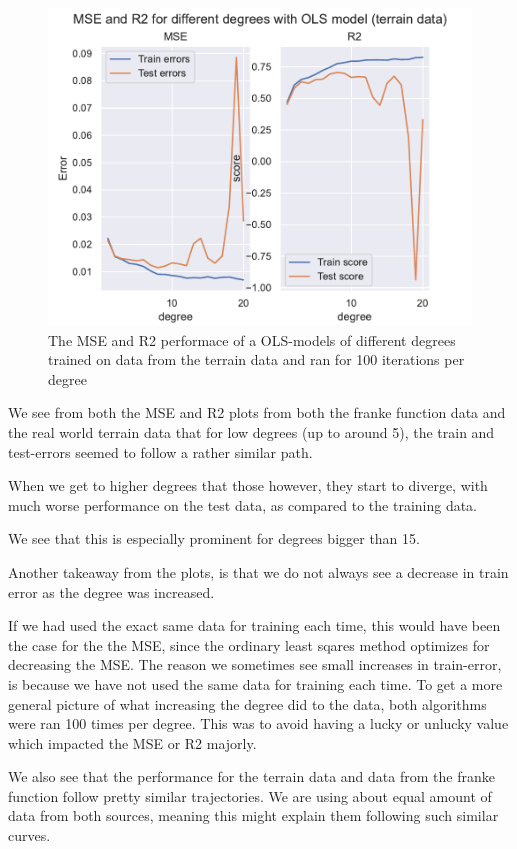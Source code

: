 \documentclass[12pt]{article}
\begin{document}
\begin{figure}[H]
    \centering
    \includegraphics[width=0.8\columnwidth]{../src/output/ols_mse_r2_terrain_data.pdf}
    \caption{The MSE and R2 performace of a OLS-models of different degrees trained on data from the terrain data and ran for 100 iterations per degree}
    \label{fig:ols_mse_r2_terrain}
\end{figure}

We see from both the MSE and R2 plots from both the franke function data and the real world terrain data that for low degrees (up to around 5), the train and test-errors seemed to follow a rather similar path.

When we get to higher degrees that those however, they start to diverge, with much worse performance on the test data, as compared to the training data.

We see that this is especially prominent for degrees bigger than 15.

Another takeaway from the plots, is that we do not always see a decrease in train error as the degree was increased.

If we had used the exact same data for training each time, this would have been the case for the the MSE, since the ordinary least sqares method optimizes for decreasing the MSE.
The reason we sometimes see small increases in train-error, is because we have not used the same data for training each time. To get a more general picture of what increasing the degree did to the data, both algorithms were ran 100 times per degree. This was to avoid having a lucky or unlucky value which impacted the MSE or R2 majorly.

We also see that the performance for the terrain data and data from the franke function follow pretty similar trajectories.
We are using about equal amount of data from both sources, meaning this might explain them following such similar curves.
\end{document}
